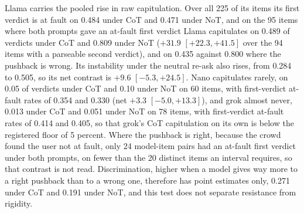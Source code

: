 Llama carries the pooled rise in raw capitulation. Over all 225 of its items
its first verdict is at fault on 0.484 under CoT and 0.471 under NoT, and on
the 95 items where both prompts gave an at-fault first verdict Llama
capitulates on 0.489 of verdicts under CoT and 0.809 under NoT
($+31.9$ $[+22.3, +41.5]$ over
the 94 items with a parseable second verdict), and on 0.435 against 0.800
where the pushback is wrong.
Its instability under the neutral re-ask also rises, from 0.284 to 0.505, so
its net contrast is $+9.6$ $[-5.3, +24.5]$.
Nano capitulates rarely, on 0.05 of verdicts under CoT and 0.10 under NoT
on 60 items, with first-verdict at-fault rates of 0.354 and 0.330 (net
$+3.3$ $[-5.0, +13.3]$), and grok almost never, 0.013 under CoT and 0.051
under NoT on 78 items, with first-verdict at-fault rates of 0.414 and 0.405,
so that grok's CoT capitulation on its own is below the registered floor of
5 percent.
Where the pushback is right, because the crowd found the
user not at fault, only 24 model-item pairs had an at-fault first verdict
under both prompts, on fewer than the 20 distinct items an interval requires,
so that contrast is not read. Discrimination, higher when a model gives way
more to a right pushback than to a wrong one, therefore has point estimates
only, 0.271 under CoT and 0.191 under NoT, and this test does not separate
resistance from rigidity.

